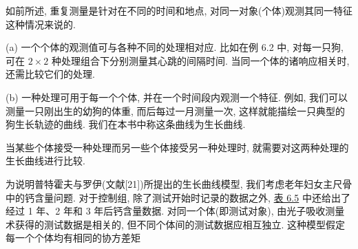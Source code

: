 如前所述, 重复测量是针对在不同的时间和地点, 对同一对象(个体)观测其同一特征这种情况来说的.

(a) 一个个体的观测值可与各种不同的处理相对应. 比如在例 6.2 中, 对每一只狗, 可在 $2\times2$ 种处理组合下分别测量其心跳的间隔时间. 当同一个体的诸响应相关时, 还需比较它们的处理.

(b) 一种处理可用于每一个个体, 并在一个时间段内观测一个特征. 例如, 我们可以测量一只刚出生的幼狗的体重, 而后每过一月测量一次, 这样就能描绘一只典型的狗生长轨迹的曲线. 我们在本书中称这条曲线为生长曲线.

当某些个体接受一种处理而另一些个体接受另一种处理时, 就需要对这两种处理的生长曲线进行比较.

为说明普特霍夫与罗伊(文献[21])所提出的生长曲线模型, 我们考虑老年妇女主尺骨中的钙含量问题. 对于控制组, 除了测试开始时记录的数据之外, \hyperref[tab:6.5]{表 6.5} 中还给出了经过 1 年、2 年和 3 年后钙含量数据. 对同一个体(即测试对象), 由光子吸收测量术获得的测试数据是相关的, 但不同个体间的测试数据应相互独立. 这种模型假定每一个个体均有相同的协方差矩

